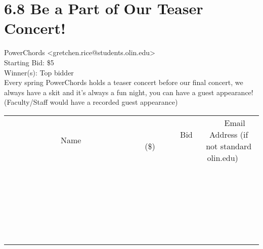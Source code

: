 \documentclass[11pt]{article}
\begin{document}
					\section*{6.8 Be a Part of Our Teaser Concert!}
					PowerChords <gretchen.rice@students.olin.edu> \\
					Starting Bid: \$5 \\
					Winner(s): Top bidder \\
					Every spring PowerChords holds a teaser concert before our final concert, we always have a skit and it's always a fun night, you can have a guest appearance! (Faculty/Staff would have a recorded guest appearance) \\
					[6ex]
					\begin{tabular}{c c c}
						~~~~~~~~~~~~~Name~~~~~~~~~~~~~ & ~~~~~~~~~Bid (\$)~~~~~~~~~ & ~~~Email Address (if not standard olin.edu)~~~ \\
				
 & & \\
\hline
 & & \\
\hline
 & & \\
\hline
 & & \\
\hline
 & & \\
\hline
 & & \\
\hline
 & & \\
\hline
 & & \\
\hline
 & & \\
\hline
 & & \\
\hline
 & & \\
\hline
 & & \\
\hline
 & & \\
\hline
 & & \\
\hline
 & & \\
\hline
 & & \\
\hline
 & & \\
\hline
 & & \\
\hline
 & & \\
\hline
 & & \\
\hline
 & & \\
\hline
 & & \\
\hline
 & & \\
\hline
 & & \\
\hline
 & & \\
\hline
 & & \\
\hline
					\end{tabular}
					\clearpage
				
\end{document}
